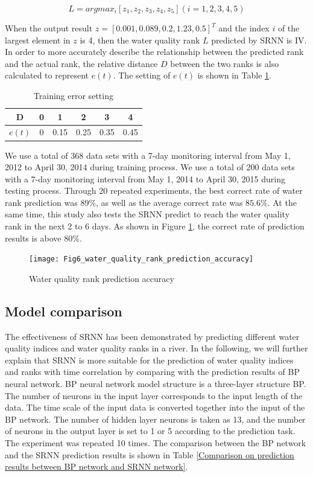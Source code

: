 \documentclass[runningheads]{llncs}
\begin{document}
\begin{equation}
L=argmax_i[z_1,z_2,z_3,z_4,z_5 ](i=1,2,3,4,5)
\end{equation}

When the output result $z = [0.001, 0.089, 0.2, 1.23, 0.5]^T$ and the index $i$ of 
the largest element in $z$ is 4, then the water quality rank $L$ predicted by SRNN is IV. 
In order to more accurately describe the relationship between the predicted 
rank and the actual rank, the relative distance $D$ between the two ranks 
is also calculated to represent $e(t)$. The setting of $e(t)$ is shown in Table \ref{Training error setting}.
\begin{table}[htbp] 
\centering
\caption{Training error setting}
\label{Training error setting}
\begin{tabular}{cccccc} 
\toprule 
D&0&1&2&3&4\\ 
\midrule 
$e(t)$&0&0.15&0.25&0.35&0.45\\ 
\bottomrule 
\end{tabular} 
\end{table}

We use a total of 368 data sets with a 7-day monitoring interval from May 1,
2012 to April 30, 2014 during training process. We use a total of 200 data sets with a 
7-day monitoring interval from May 1, 2014 to April 30, 2015 during testing process. 
Through 20 repeated experiments, the best correct rate of water rank prediction was $89\%$,
as well as the average correct rate was $85.6\%$. At the same time, 
this study also tests the SRNN predict to reach the water quality
rank in the next 2 to 6 days.  As shown in Figure \ref{Water quality rank prediction accuracy},
the correct rate of prediction results is above $80\%$.

\begin{figure}[htbp]
\centering
\texttt{[image: Fig6\_water\_quality\_rank\_prediction\_accuracy]}
\caption{Water quality rank prediction accuracy}
\label{Water quality rank prediction accuracy}
\end{figure}

\subsection{Model comparison}
The effectiveness of SRNN has been demonstrated by predicting 
different water quality indices and water quality ranks in a river. 
In the following, we will further explain that SRNN is more suitable 
for the prediction of water quality indices and ranks with time 
correlation by comparing with the prediction results of BP neural network. 
BP neural network model structure is a three-layer structure BP. The number 
of neurons in the input layer corresponds to the input length of the data. 
The time scale of the input data is converted together into the input of 
the BP network. The number of hidden layer neurons is taken as 13, 
and the number of neurons in the output layer is set to 1 or 5 according 
to the prediction task. The experiment was repeated 10 times. 
The comparison between the BP network and the SRNN prediction results is shown in Table 
\ref{Comparison on prediction results between BP network and SRNN network}.
\end{document}

